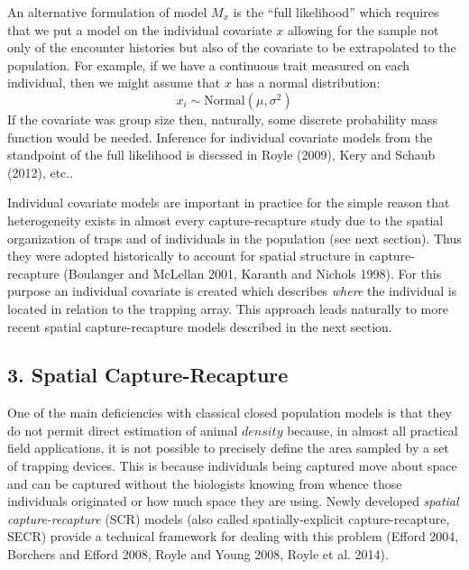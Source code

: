 \documentclass{book}
\begin{document}
An alternative formulation of model $M_x$ is the ``full likelihood''
which requires that we put a model on the individual covariate $x$
allowing for the sample not only of the encounter histories but also
of the covariate to be extrapolated to the population.
 For example, if we have a continuous trait measured on
each individual, then we might assume that $x$ has a normal distribution:
\[
x_{i} \sim \mbox{Normal}(\mu,\sigma^{2})
\]
If the covariate was group size then, naturally, some discrete
probability mass function would be needed. Inference for individual
covariate models from the standpoint of the  full likelihood is
discssed in Royle (2009), Kery and Schaub (2012), etc..

Individual covariate models are important in practice for the simple
reason that heterogeneity exists in almost every capture-recapture
study due to the spatial organization of traps and of individuals in
the population (see next section). Thus they were adopted historically
to account for spatial structure in capture-recapture (Boulanger and
McLellan 2001, Karanth and Nichols 1998).  For this purpose an
individual covariate is created which describes {\it where} the
individual is located in relation to the trapping array.  This
approach leads naturally to more recent spatial capture-recapture
models described in the next section.



\subsection*{3. Spatial Capture-Recapture}

One of the main deficiencies with classical closed population models
is that they do not permit direct estimation of animal $density$
because, in almost all practical field applications, it is not
possible to precisely define the area sampled by a set of trapping
devices. This is because individuals being captured  move about
space and can be captured without the biologists knowing from whence
those individuals originated or how much space they are using. Newly
developed {\it spatial capture-recapture} (SCR) models (also called
spatially-explicit capture-recapture, SECR) provide a technical framework for
dealing with this problem (Efford 2004, Borchers and Efford 2008,
Royle and Young 2008, Royle et al. 2014). 
\end{document}
